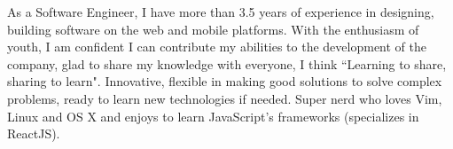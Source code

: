 

\begin{cvparagraph}

As a Software Engineer, I have more than 3.5 years of experience in designing, building software on the web and mobile platforms. With the enthusiasm of youth, I am confident I can contribute my abilities to the development of the company, glad to share my knowledge with everyone, I think ``Learning to share, sharing to learn". Innovative, flexible in making good solutions to solve complex problems, ready to learn new technologies if needed. Super nerd who loves Vim, Linux and OS X and enjoys to learn JavaScript's frameworks (specializes in ReactJS).
\end{cvparagraph}
